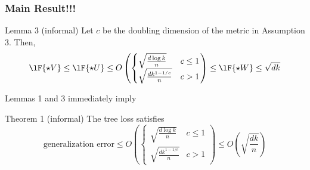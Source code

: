\begin{frame}
\frametitle{Main Result!!!}



\begin{block}{Lemma 3 (informal)}
Let $c$ be the doubling dimension of the metric in Assumption 3.
Then,
\begin{equation}
\lF{\star V} \le \lF{\star U} \le 
O\left(
\begin{cases}
\sqrt{\frac{d \log k}{n}} & c \le 1\\
\sqrt{\frac{d k^{1-1/c}}{n}} & c > 1
\end{cases}
\right)
\le \lF{\star W} \le \sqrt{dk}
\end{equation}
\end{block}

\vspace{0.1in}
Lemmas 1 and 3 immediately imply

\vspace{0.1in}
\begin{block}{Theorem 1 (informal)}
The tree loss satisfies
\begin{equation}
\text{generalization error} \le
O\left(
\begin{cases}
\sqrt{\frac{d \log k}{n}} & c \le 1\\
\sqrt{\frac{d k^{1-1/c}}{n}} & c > 1
\end{cases}
\right)
\le
O\left(\sqrt{\frac{dk}{n}}\right)
\end{equation}
\end{block}

\end{frame}


